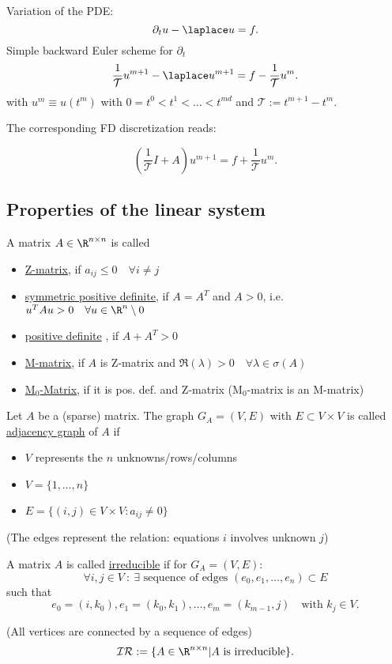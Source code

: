 Variation of the PDE:
\[
\partial_{t}u- \laplace u=f
.\] 
Simple backward Euler scheme for $\partial_{t}$
\[
\frac{1}{\mathcal{T}}u^{m+1}- \laplace u^{m+1} = f -\frac{1}{\mathcal{T}}u^{m}
.\] 
with $u^{m} \equiv u(t^{m})$ with $0=t^{0}<t^{1}< \ldots  < t^{md}$ and $\mathcal{T}:=t^{m+1}-t^{m}$.

The corresponding FD discretization reads:

\[
	\left(\frac{1}{\mathcal{T}}I + A\right) u^{m+1} = f + \frac{1}{\mathcal{T}}u^{m}
.\] 

\subsection{Properties of the linear system}%
\label{sec:Properties of the linear system}

\begin{definition}
\label{thm:typeOfMatrices}
	A matrix $A \in  \R^{n \times n}$ is called
	\begin{itemize}
		\item \underline{Z-matrix}, if $a_{ij}\leq 0\quad \forall i\neq j$
		\item \underline{symmetric positive definite}, if $A=A^{T}$ and $A>0$, i.e. $u^{T}Au>0\quad\forall u \in \R^{n} \setminus 0$
		\item \underline{positive definite} , if $A+A^{T}>0$
		\item \underline{M-matrix}, if $A$ is Z-matrix and $\Re(\lambda) > 0 \quad\forall \lambda \in \sigma (A)$
		\item \underline{M$_{0}$-Matrix}, if it is pos. def. and Z-matrix (M$_{0}$-matrix is an M-matrix)
	\end{itemize}
\end{definition}

\begin{definition}
\label{thm:adjacenyGraph}
Let $A$ be a (sparse) matrix. The graph $G_{A}=(V,E)$ with $E \subset V \times V$ is called \underline{adjacency graph} of $A$ if 
\begin{itemize}[label=]
	\item $V$ represents the $n$ unknowns/rows/columns
	\item $V=\{1, \ldots, n\}$
	\item $E=\{(i,j) \in  V \times V : a_{ij}\neq 0\}$
\end{itemize}
(The edges represent the relation: equations $i$ involves unknown $j$)
\end{definition}

\begin{definition}
\label{thm:irreducible}
A matrix $A$ is called \underline{irreducible} if for $G_{A}=(V,E)$:
\[
	\forall i,j \in V ~:~ \exists \text{ sequence of edges } (e_0, e_1, \ldots , e_{n}) \subset E
\] 
such that
\[
	e_0=(i, k_0), e_1=(k_0,k_1),\ldots , e_{m}=(k_{m-1},j) \quad \text{with } k_{j} \in V
.\] 

(All vertices are connected by a sequence of edges)
\[
	\mathcal{IR}:= \{A \in  \R^{n \times  n} | A \text{ is irreducible}\}
.\] 
\end{definition}

